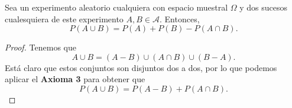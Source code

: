 \begin{prop}
Sea un experimento aleatorio cualquiera con espacio muestral $\displaystyle \Omega  $ y dos sucesos cualesquiera de este experimento $\displaystyle A,B \in \mathcal{A} $. Entonces, 
\[P\left(A\cup B\right) = P\left(A\right) + P\left(B\right) - P\left(A \cap B\right) .\]
\end{prop}
\begin{proof}
Tenemos que 
\[A \cup B = \left(A-B\right) \cup \left(A \cap B\right) \cup \left(B-A\right) .\]
Está claro que estos conjuntos son disjuntos dos a dos, por lo que podemos aplicar el \textbf{Axioma 3} para obtener que
\[P\left(A \cup B\right) = P\left(A-B\right) + P\left(A \cap B\right) .\]

\end{proof}

